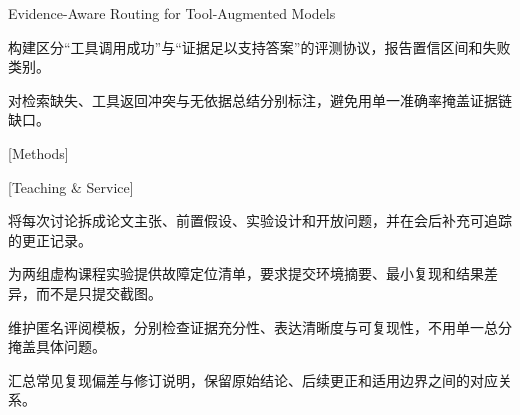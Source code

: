 \resumeitemheading
  {Evidence-Aware Routing for Tool-Augmented Models}
  {}
\begin{resumelist}
  \item 构建区分“工具调用成功”与“证据足以支持答案”的评测协议，报告置信区间和失败类别。
  \item 对检索缺失、工具返回冲突与无依据总结分别标注，避免用单一准确率掩盖证据链缺口。
\end{resumelist}

\begin{resumegrid}[2]
\end{resumegrid}

[Methods]

\begin{resumegrid}[2]
\end{resumegrid}

[Teaching \& Service]

\begin{resumelist}
  \item 将每次讨论拆成论文主张、前置假设、实验设计和开放问题，并在会后补充可追踪的更正记录。
  \item 为两组虚构课程实验提供故障定位清单，要求提交环境摘要、最小复现和结果差异，而不是只提交截图。
  \item 维护匿名评阅模板，分别检查证据充分性、表达清晰度与可复现性，不用单一总分掩盖具体问题。
  \item 汇总常见复现偏差与修订说明，保留原始结论、后续更正和适用边界之间的对应关系。
\end{resumelist}
